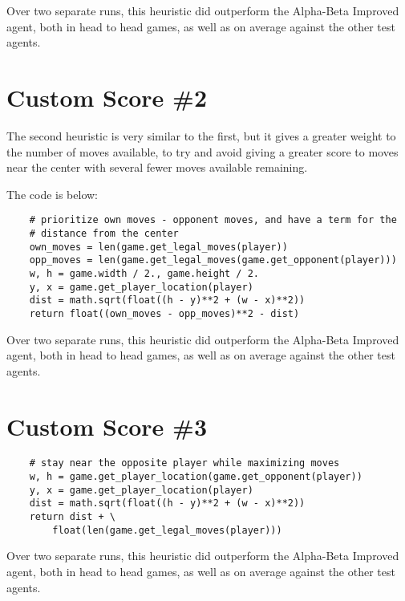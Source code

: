 \documentclass{article}
\begin{document}
Over two separate runs, this heuristic did outperform the Alpha-Beta Improved agent, both in head to head games, as well
as on average against the other test agents.
 
\section{Custom Score \#2}
The second heuristic is very similar to the first, but it gives a greater weight to the number of moves available,
to try and avoid giving a greater score to moves near the center with several fewer moves available remaining.

The code is below:
\begin{lstlisting}
    # prioritize own moves - opponent moves, and have a term for the
    # distance from the center
    own_moves = len(game.get_legal_moves(player))
    opp_moves = len(game.get_legal_moves(game.get_opponent(player)))
    w, h = game.width / 2., game.height / 2.
    y, x = game.get_player_location(player)
    dist = math.sqrt(float((h - y)**2 + (w - x)**2))
    return float((own_moves - opp_moves)**2 - dist)
\end{lstlisting}

Over two separate runs, this heuristic did outperform the Alpha-Beta Improved agent, both in head to head games, as well
as on average against the other test agents.
\section{Custom Score \#3}

\begin{lstlisting}
    # stay near the opposite player while maximizing moves
    w, h = game.get_player_location(game.get_opponent(player))
    y, x = game.get_player_location(player)
    dist = math.sqrt(float((h - y)**2 + (w - x)**2))
    return dist + \
        float(len(game.get_legal_moves(player)))
\end{lstlisting}

Over two separate runs, this heuristic did outperform the Alpha-Beta Improved agent, both in head to head games, as well
as on average against the other test agents.
\end{document}
